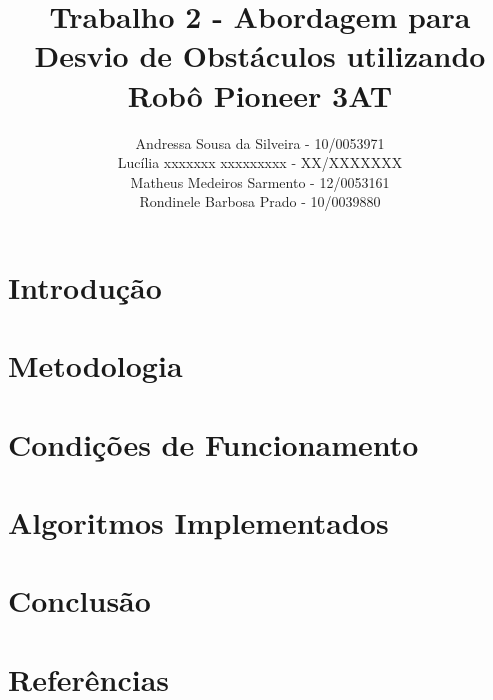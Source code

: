 \documentclass[11pt,a4paper]{article}
\title{
Trabalho 2 - Abordagem para Desvio de Obstáculos utilizando Robô Pioneer 3AT
}
\author{
Andressa Sousa da Silveira - 10/0053971 \\
Lucília xxxxxxx xxxxxxxxx - XX/XXXXXXX \\
Matheus Medeiros Sarmento - 12/0053161 \\
Rondinele Barbosa Prado - 10/0039880 \\
%
}
\begin{document}
\maketitle
\lstset{language=C++} 


\thispagestyle{empty}
\pagestyle{empty}

\section{Introdução}


\section{Metodologia}


\section{Condições de Funcionamento}


\section{Algoritmos Implementados}



\section{Conclusão}


\section{Referências}

\end{document}
